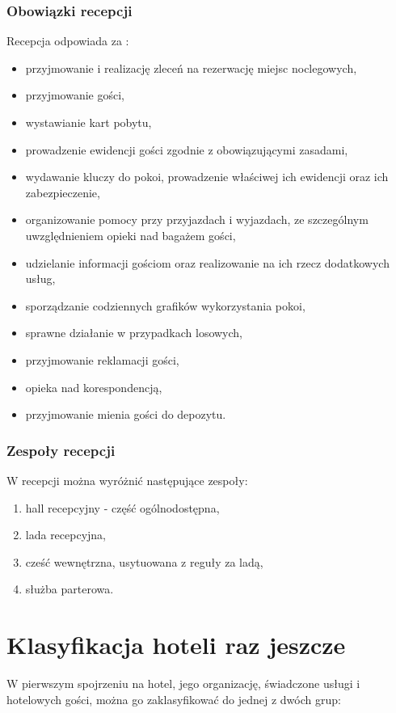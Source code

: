 \documentclass[a4paper,onecolumn,oneside,11pt,wide,floatssmall]{mwrep}
\theoremstyle{definition}
\theoremstyle{plain}%
\theoremstyle{remark}
\begin{document}
\subsubsection{Obowiązki recepcji} 
Recepcja odpowiada za \cite{OrgaDzialHot}:

\begin{itemize}
  \item przyjmowanie i realizację zleceń na rezerwację miejsc noclegowych,
  \item przyjmowanie gości,
  \item wystawianie kart pobytu,
  \item prowadzenie ewidencji gości zgodnie z obowiązującymi zasadami,
  \item wydawanie kluczy do pokoi, prowadzenie właściwej ich ewidencji oraz 
  ich zabezpieczenie,
  \item organizowanie pomocy przy przyjazdach i wyjazdach, ze szczególnym 
  uwzględnieniem opieki nad bagażem gości,
  \item udzielanie informacji gościom oraz realizowanie na ich rzecz 
  dodatkowych usług,
  \item sporządzanie codziennych grafików wykorzystania pokoi,
  \item sprawne działanie w przypadkach losowych,
  \item przyjmowanie reklamacji gości,
  \item opieka nad korespondencją,
  \item przyjmowanie mienia gości do depozytu.
\end{itemize}

\subsubsection{Zespoły recepcji}
W recepcji można wyróżnić następujące zespoły\cite{hotel2:part1}:
\begin{enumerate}
  \item hall recepcyjny - część ogólnodostępna,
  \item lada recepcyjna,
  \item cześć wewnętrzna, usytuowana z reguły za ladą,
  \item służba parterowa.
\end{enumerate}

\section{Klasyfikacja hoteli raz jeszcze}
W pierwszym spojrzeniu na hotel, jego organizację, świadczone usługi i 
hotelowych gości, można go zaklasyfikować do jednej z dwóch grup:
\end{document}
